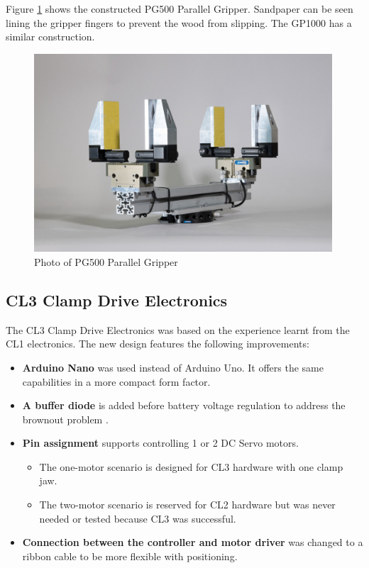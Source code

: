 Figure \ref{fig:photo-pg500} shows the constructed PG500 Parallel Gripper. Sandpaper can be seen lining the gripper fingers to prevent the wood from slipping. The GP1000 has a similar construction. 

\begin{figure}
    \centering
    \includegraphics[width=0.99\textwidth]{images/05/image42.jpg}
    \caption{Photo of PG500 Parallel Gripper}
    \label{fig:photo-pg500}
\end{figure}

\subsection{CL3 Clamp Drive Electronics}
\label{subsection:exploration-2-cl3-clamp-electronics}

The CL3 Clamp Drive Electronics was based on the experience learnt from the CL1 electronics. The new design features the following improvements:

\begin{itemize}[nosep]
    \item \textbf{Arduino Nano} was used instead of Arduino Uno. It offers the same capabilities in a more compact form factor.
    \item \textbf{A buffer diode} is added before battery voltage regulation to address the brownout problem .
    \item \textbf{Pin assignment} supports controlling 1 or 2 DC Servo motors. 
    \begin{itemize}
        \item The one-motor scenario is designed for CL3 hardware with one clamp jaw. 
        \item The two-motor scenario is reserved for CL2 hardware but was never needed or tested because CL3 was successful.
    \end{itemize}
    \item \textbf{Connection between the controller and motor driver} was changed to a ribbon cable to be more flexible with positioning.
\end{itemize}

